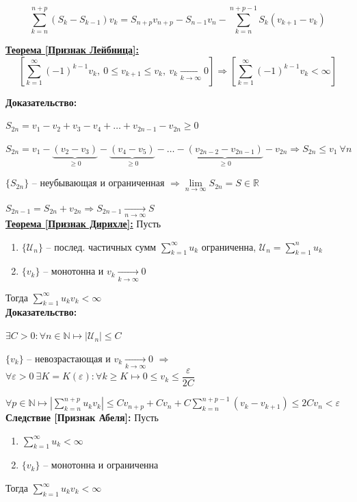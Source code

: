 \documentclass[a4paper,12pt]{article} %
\newcommand{\R}{\mathbb{R}}
\newcommand{\N}{\mathbb{N}}
\newcommand{\series}{\sum\limits_{k=1}^{\infty}}
\newcommand{\useries}{\sum\limits_{k=1}^{\infty} u_k}
\newcommand{\useriesl}{\sum\limits_{k=1}^{\infty} u_k < \infty}
\newcommand{\sn}{\sum\limits_{k=1}^{n} u_k}
\begin{document}
\[ \sum\limits_{k=n}^{n+p}(S_k - S_{k-1}) v_k = S_{n+p}v_{n+p} - S_{n-1}v_n - \sum\limits_{k=n}^{n+p-1}S_k(v_{k+1} - v_k) \]

\underline{\textbf{Теорема [Признак Лейбница]:}}
\[ \left[ \series (-1)^{k-1} v_k, \ 0 \leqslant v_{k+1} \leqslant v_k, \ v_k \xrightarrow[k \to \infty]{} 0 \right] \Rightarrow \left[ \series (-1)^{k-1} v_k < \infty \right] \]

\textbf{Доказательство:}

$S_{2n} = v_1 - v_2 + v_3 - v_4 + \ldots + v_{2n-1} - v_{2n} \geqslant 0$

$S_{2n} = v_1 - \underbrace{(v_2 - v_3)}_{\geqslant 0} -  \underbrace{(v_4 - v_5)}_{\geqslant 0} - \ldots - \underbrace{(v_{2n-2} - v_{2n-1})}_{\geqslant 0} - v_{2n} \Rightarrow S_{2n} \leqslant v_1 \ \forall n$


$\{S_{2n}\}$ -- неубывающая и ограниченная $\Rightarrow \lim\limits_{n \to \infty} S_{2n} = S \in \R$


$S_{2n-1} = S_{2n} + v_{2n} \Rightarrow S_{2n-1} \xrightarrow[n \to \infty]{} S$\\

\underline{\textbf{Теорема [Признак Дирихле]:}} Пусть
\begin{enumerate}
	\item $\{ \mathscr{U}_n \}$ -- послед. частичных сумм $\useries$ ограниченна, $\mathscr{U}_n = \sn$
	\item $\{v_k\}$ -- монотонна и $v_k \xrightarrow[k \to \infty]{} 0$
\end{enumerate}
Тогда $\sum\limits_{k=1}^{\infty} u_k v_k < \infty$\\

\textbf{Доказательство:}

$\exists C > 0: \forall n \in \N \mapsto \left| \mathscr{U}_n \right| \leqslant C$

$\{v_k\}$ -- невозрастающая и $v_k \xrightarrow[k \to \infty]{} 0$
 $\Rightarrow$ $\forall \varepsilon > 0 \ \exists K = K(\varepsilon): \forall k \geqslant K \mapsto 0 \leqslant v_k \leqslant \dfrac{\varepsilon}{2C}$

$\forall p \in \N \mapsto \left| \sum\limits_{k=n}^{n+p} u_k v_k \right| \leqslant C v_{n+p} + C v_n + C \sum\limits_{k=n}^{n+p-1}(v_k - v_{k+1}) \leqslant 2Cv_n < \varepsilon$\\

\textbf{Следствие [Признак Абеля]:} Пусть
\begin{enumerate}
	\item $\useriesl$
	\item $\{v_k\}$ -- монотонна и ограниченна
\end{enumerate}
Тогда $\sum\limits_{k=1}^{\infty} u_k v_k < \infty$\\
\end{document}
